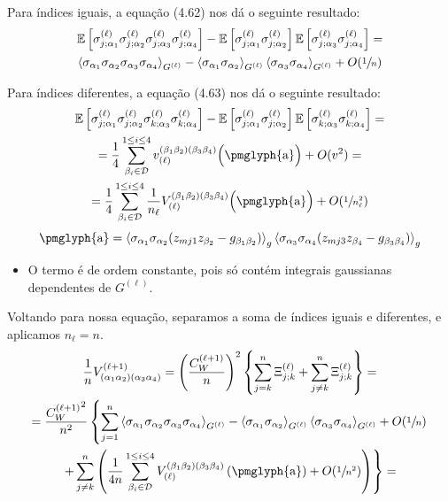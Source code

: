 \documentclass{beamer}
\newcommand{\EE}{\mathbb{E}}
\newcommand{\Dcal}{\mathcal{D}}
\def\mi#1{{\alpha_{#1}}}
\def\mj#1{\beta_{#1}}
\def\eell{{(\ell)}}
\def\eellum{{(\ell+1)}}
\newcommand{\Vertice}[5]{V^{(#1)}_{(\mi#2\mi#3)(\mi#4\mi#5)}}
\newcommand{\Verticeinvb}[5]{V_{(#1)}^{(\mj#2\mj#3)(\mj#4\mj#5)}}
\newcommand{\Expectation}[2]{\left\langle #1 \right\rangle_{#2}}
\begin{document}
\begin{frame}
	Para índices iguais, a equação (4.62) nos dá o seguinte resultado:
	{
\begin{multline*}
	\EE\left[\sigma_{j;\mi1}^\eell\sigma_{j;\mi2}^\eell \sigma_{j;\mi3}^\eell\sigma_{j;\mi4}^\eell\right] - \EE\left[\sigma_{j;\mi1}^\eell\sigma_{j;\mi2}^\eell\right]\EE\left[\sigma_{j;\mi3}^\eell\sigma_{j;\mi4}^\eell\right] = \\
	\Expectation{\sigma_\mi1\sigma_\mi2\sigma_\mi3\sigma_\mi4}{G^\eell} - \Expectation{\sigma_\mi1\sigma_\mi2}{G^\eell}  \Expectation{\sigma_\mi3\sigma_\mi4}{G^\eell}  +  O(\sfrac{1}{n})
\end{multline*}
	}
\end{frame}

\begin{frame}
	Para índices diferentes, a equação (4.63) nos dá o seguinte resultado:
	{\small
	\begin{multline*}
		\EE\left[\sigma_{j;\mi1}^\eell\sigma_{j;\mi2}^\eell \sigma_{k;\mi3}^\eell\sigma_{k;\mi4}^\eell\right] - \EE\left[\sigma_{j;\mi1}^\eell\sigma_{j;\mi2}^\eell\right]\EE\left[\sigma_{k;\mi3}^\eell\sigma_{k;\mi4}^\eell\right] = \\ =
		\frac{1}{4}\sum_{\mj{i}\in\Dcal}^{1\le{i}\le4}v^{(\mj1\mj2)(\mj3\mj4)}_{\eell}\Big(\text{\pmglyph{a}}\Big)  + O(v^2) =\\
		= \frac{1}{4}\sum_{\mj{i}\in\Dcal}^{1\le{i}\le4} \frac{1}{n_\ell}{\Verticeinvb{\ell}1234} \Big(\text{\pmglyph{a}}\Big)  + O(\sfrac{1}{n_\ell^2}) 
	\end{multline*}
	\begin{equation*}
		\text{\pmglyph{a}} = \Expectation{\sigma_{\mi1}\sigma_{\mi2}(z_{mj1}z_{\mj2} - g_{\mj1\mj2}) }{g}\Expectation{\sigma_{\mi3}\sigma_{\mi4}(z_{mj3}z_{\mj4} - g_{\mj3\mj4}) }{g} 
	\end{equation*}
	}
	\begin{itemize} 
		\item O termo  é de ordem constante, pois só contém integrais gaussianas dependentes de $G^\eell$.
	\end{itemize}
\end{frame}

\begin{frame}
	Voltando para nossa equação, separamos a soma de índices iguais e diferentes, e aplicamos $n_\ell = n$.
	\small
	\begin{multline*}
		\frac{1}{n}\Vertice{\ell+1}1234 =  \left(\frac{C_W^\eellum}{n}\right)^2 \left\{\sum_{j=k}^{n}\Xi_{j;k}^\eell + \sum_{j\neq k}^{n}\Xi_{j;k}^\eell\right\} = \\
		= \frac{{C_W^\eellum}^2}{n^2} \left\{\sum_{j=1}^{n}\Expectation{\sigma_\mi1\sigma_\mi2\sigma_\mi3\sigma_\mi4}{G^\eell} - \Expectation{\sigma_\mi1\sigma_\mi2}{G^\eell}  \Expectation{\sigma_\mi3\sigma_\mi4}{G^\eell}  +  O(\sfrac{1}{n}) \right.\\ 
		\left. +\sum_{j\neq k}^{n}\left(\frac{1}{4n}\sum_{\mj{i}\in\Dcal}^{1\le{i}\le4}\Verticeinvb{\ell}1234\left(\text{\pmglyph{a}}\right) + O(\sfrac{1}{n^2})\right)\right\} =
	\end{multline*}
\end{frame}
\end{document}
